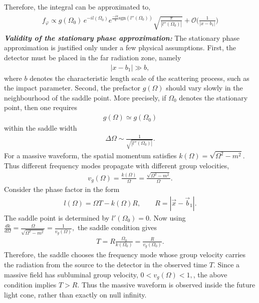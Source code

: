 {\begin{align}
\end{align}
Therefore, the integral can be approximated to,
\begin{align}
    \begin{split}
        f_{\varphi}\propto g(\Omega_0) \,e^{-i l(\Omega_0)}e^{\frac{-i\pi}{4}\textrm{sgn}(l''(\Omega_0))}\sqrt{\frac{\pi}{|l''(\Omega_0)|}}+\mathcal{O}\Big(\frac{1}{|x-b_1|}\Big)
    \end{split}
\end{align}
{\color{black}
\textbf{\textit{Validity of the stationary phase approximation:}}
The stationary phase approximation is justified only under a few physical assumptions. First, the detector must be placed in the far radiation zone, namely
\begin{align}
    |x-b_1|\gg b,
\end{align}
where \(b\) denotes the characteristic length scale of the scattering process, such as the impact parameter. Second, the prefactor \(g(\Omega)\) should vary slowly in the neighbourhood of the saddle point. More precisely, if \(\Omega_0\) denotes the stationary point, then one requires
\begin{align}
    g(\Omega)\simeq g(\Omega_0)
\end{align}
within the saddle width
\begin{align}
    \Delta\Omega \sim \frac{1}{\sqrt{|l''(\Omega_0)|}} .
\end{align}
For a massive waveform, the spatial momentum satisfies  $ k(\Omega)=\sqrt{\Omega^2-m^2}.$ Thus different frequency modes propagate with different group velocities,
\begin{align}
    v_g(\Omega)
    =
    \frac{k(\Omega)}{\Omega}
    =
    \frac{\sqrt{\Omega^2-m^2}}{\Omega}.
\end{align}
Consider the phase factor in the form
\begin{align}
    l(\Omega)=\Omega T-k(\Omega)R,
    \qquad
    R=|\vec{x}-\vec{b}_1| .
\end{align}
The saddle point is determined by $   l'(\Omega_0)=0 .$ Now using $   \frac{dk}{d\Omega}
    =
    \frac{\Omega}{\sqrt{\Omega^2-m^2}}
    =
    \frac{1}{v_g(\Omega)},$ the saddle condition gives
\begin{align}
    T
    =
    R\frac{\Omega_0}{k(\Omega_0)}
    =
    \frac{R}{v_g(\Omega_0)} .
\end{align}
Therefore, the saddle chooses the frequency mode whose group velocity carries the radiation from the source to the detector in the observed time \(T\). Since a massive field has subluminal group velocity,  $  0<v_g(\Omega)<1,$, the above condition implies   $ T>R .$ Thus the massive waveform is observed inside the future light cone, rather than exactly on null infinity.
}}
